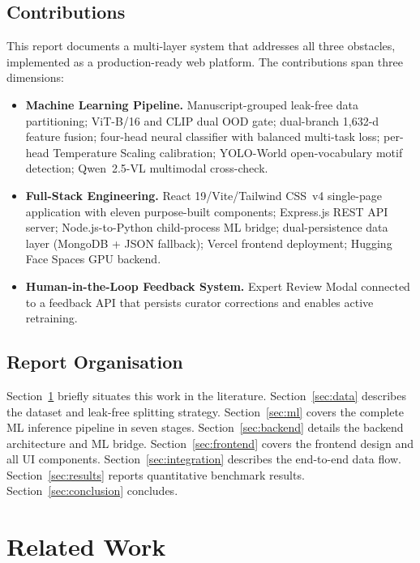 \documentclass[12pt, a4paper, twoside]{article}
\begin{document}
\subsection{Contributions}

This report documents a multi-layer system that addresses all three obstacles, implemented as a production-ready web platform. The contributions span three dimensions:

\begin{itemize}
  \item \textbf{Machine Learning Pipeline.} Manuscript-grouped leak-free data partitioning; ViT-B/16 and CLIP dual OOD gate; dual-branch 1,632-d feature fusion; four-head neural classifier with balanced multi-task loss; per-head Temperature Scaling calibration; YOLO-World open-vocabulary motif detection; Qwen~2.5-VL multimodal cross-check.
  \item \textbf{Full-Stack Engineering.} React 19/Vite/Tailwind CSS~v4 single-page application with eleven purpose-built components; Express.js REST API server; Node.js-to-Python child-process ML bridge; dual-persistence data layer (MongoDB + JSON fallback); Vercel frontend deployment; Hugging Face Spaces GPU backend.
  \item \textbf{Human-in-the-Loop Feedback System.} Expert Review Modal connected to a feedback API that persists curator corrections and enables active retraining.
\end{itemize}

\subsection{Report Organisation}

Section~\ref{sec:related} briefly situates this work in the literature. Section~\ref{sec:data} describes the dataset and leak-free splitting strategy. Section~\ref{sec:ml} covers the complete ML inference pipeline in seven stages. Section~\ref{sec:backend} details the backend architecture and ML bridge. Section~\ref{sec:frontend} covers the frontend design and all UI components. Section~\ref{sec:integration} describes the end-to-end data flow. Section~\ref{sec:results} reports quantitative benchmark results. Section~\ref{sec:conclusion} concludes.

\section{Related Work}
\label{sec:related}
\end{document}
